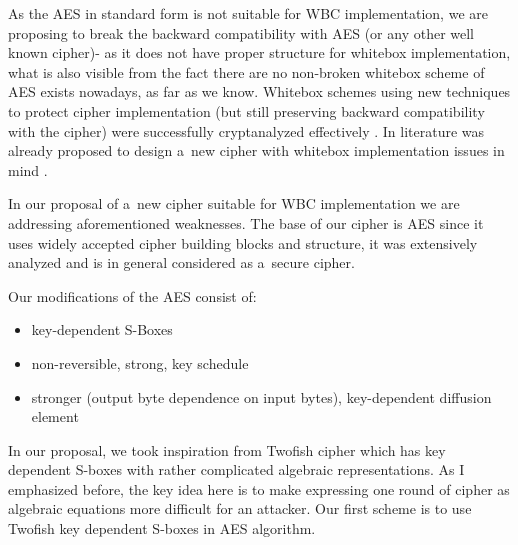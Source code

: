 \documentclass[11pt,oneside,final]{fithesis2}
\begin{document}
    As the AES in standard form is not suitable for WBC implementation, we are proposing to break the backward compatibility with AES (or any other well known cipher)- as it does not have proper structure for whitebox implementation, what is 
    also visible from the fact there are no non-broken whitebox scheme of AES exists nowadays, as far as we know. Whitebox schemes using new techniques to protect cipher implementation
    (but still preserving backward compatibility with the cipher) were successfully cryptanalyzed effectively \citep{Billet:2004:CWB:2080787.2080809, Michiels:2007:MST:1314276.1314291, conf/indocrypt/MulderWP10, conf/sacrypt/MulderRP12}.    
    In literature was already proposed to design a~new cipher with whitebox implementation issues in mind \citep{Billet:2004:CWB:2080787.2080809, wyseurPhd}. 
    
    In our proposal of a~new cipher suitable for WBC implementation we are addressing aforementioned weaknesses. The base of our cipher is AES since it uses widely accepted
    cipher building blocks and structure, it was extensively analyzed and is in general considered as a~secure cipher.
	
    Our modifications of the AES consist of:
    \begin{itemize}
     \item key-dependent S-Boxes
     \item non-reversible, strong, key schedule
     \item stronger (output byte dependence on input bytes), key-dependent diffusion element
    \end{itemize}

    In our proposal, we took inspiration from Twofish \cite{Schneier98twofish:a} cipher which has key dependent S-boxes with rather
    complicated algebraic representations. As I emphasized before, the key idea here is to make expressing one round of cipher as algebraic equations
    more difficult for an attacker. Our first scheme is to use Twofish key dependent S-boxes in AES algorithm. 
\end{document}
